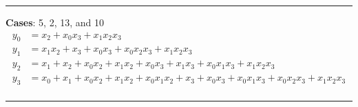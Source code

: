 \begin{minipage}{.8\textwidth}
\hrule
\vspace{2em}
\noindent 

\textbf{Cases}: 5, 2, 13, and 10
\begin{align*}
y_0 & = x_2 + x_0x_3 + x_1x_2x_3 \\
y_1 & = x_1x_2 + x_3 + x_0x_3 + x_0x_2x_3 + x_1x_2x_3 \\
y_2 & = x_1 + x_2 + x_0x_2 + x_1x_2 + x_0x_3 + x_1x_3 + x_0x_1x_3 + x_1x_2x_3 \\
y_3 & = x_0 + x_1 + x_0x_2 + x_1x_2 + x_0x_1x_2 + x_3 + x_0x_3 + x_0x_1x_3 + x_0x_2x_3 + x_1x_2x_3 \\
\end{align*}
\vspace{-1em}

\hrule

\end{minipage}
\newpage
